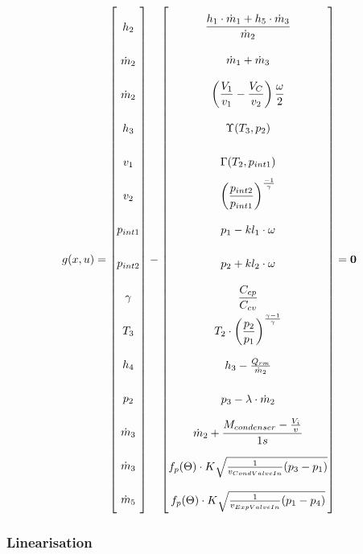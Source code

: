 \begin{equation} \label{eq:consump_x}\renewcommand{\arraystretch}{2.5}
	g(x,u) =  \begin{bmatrix}
		h_{2}\\
		\dot{m}_{2} \\
		\dot{m}_2   \\
		h_{3}		\\
		v_1			\\
		v_2			\\
		p_{int1}			\\
		p_{int2}			\\
		\gamma					\\
		T_{3}					\\
		h_{4}					\\
		p_{2}					\\
		\dot{m}_{3}			\\
		\dot{m}_{3}			\\
		\dot{m}_{5}			\\
	\end{bmatrix}
	-
	\begin{bmatrix}
		\dfrac{h_{1} \cdot \dot{m}_{1} + h_{5} \cdot \dot{m}_{3}}{ \dot{m}_{2} } \\ 	%
		\dot{m}_{1} + \dot{m}_{3} \\													%
		 \left(\dfrac{V_1}{v_1} - \dfrac{V_C}{v_2}\right) \dfrac{\omega}{2} \\			%
		 \Upsilon(T_{3}, p_{2})		\\													%
		 \Gamma(T_{2},p_{int1}) \\														%
		 \left(\dfrac{p_{int2}}{p_{int1}}\right)^{\frac{-1}{\gamma}} \\					%
		 p_{1} - kl_1 \cdot \omega \\													%
		 p_{2} + kl_2 \cdot \omega \\													%
		 \dfrac{C_{cp}}{C_{cv}} \\														%
		 T_{2}\cdot \left(\dfrac{p_{2}}{p_{1}}\right)^{\frac{\gamma-1}{\gamma}}	\\		%
		 h_{3} - \frac{Q_{rm}}{\dot{m}_{2}}	\\											%
		 p_{3} - \lambda \cdot \dot{m}_{2}			\\									%
		 \dot{m}_{2} + \dfrac{M_{condenser} - \frac{V_i}{v}}{1s}	\\					%
		 f_p(\Theta) \cdot K  \sqrt{\frac{1}{v_{CondValveIn}} (p_{3} - p_{1})}\\		%
		 f_p(\Theta) \cdot K  \sqrt{\frac{1}{v_{ExpValveIn}} (p_{1} - p_{4})}\\			%
	\end{bmatrix}
=\textbf{0}
\end{equation}




\newpage
\subsubsection{Linearisation}